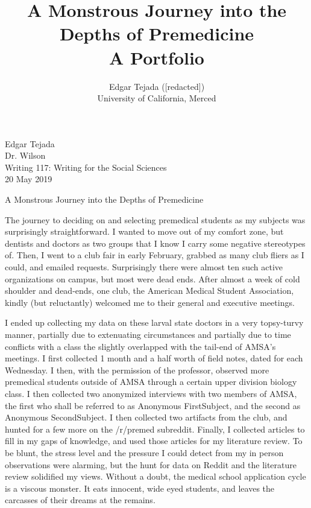 \documentclass [12pt]{article}
\title{A Monstrous Journey into the Depths of Premedicine\\\medskip A Portfolio}
\author{Edgar Tejada ([redacted])\\University of California, Merced}
\begin{document}
\begin{flushleft}
Edgar Tejada\\
Dr. Wilson\\
Writing 117: Writing for the Social Sciences\\
20 May 2019\\


\begin{center}
	A Monstrous Journey into the Depths of Premedicine\\
\end{center}


\setlength{\parindent}{0.5in}
The journey to deciding on and selecting premedical students as my subjects was surprisingly straightforward. I wanted to move out of my comfort zone, but dentists and doctors as two groups that I know I carry some negative stereotypes of. Then, I went to a club fair in early February, grabbed as many club fliers as I could, and emailed requests. Surprisingly there were almost ten such active organizations on campus, but most were dead ends.
After almost a week of cold shoulder and dead-ends, one club, the American Medical Student Association, kindly (but reluctantly) welcomed me to their general and executive meetings.

I ended up collecting my data on these larval state doctors in a very topsy-turvy manner, partially due to extenuating circumstances and partially due to time conflicts with a class the slightly overlapped with the tail-end of AMSA's meetings. I first collected 1 month and a half worth of field notes, dated for each Wednesday. I then, with the permission of the professor, observed more premedical students outside of AMSA through a certain upper division biology class. I then collected two anonymized interviews with two members of AMSA, the first who shall be referred to as Anonymous FirstSubject, and the second as Anonymous SecondSubject. I then collected two artifacts from the club, and hunted for a few more on the /r/premed subreddit. Finally, I collected articles to fill in my gaps of knowledge, and used those articles for my literature review. To be blunt, the stress level and the pressure I could detect from my in person observations were alarming, but the hunt for data on Reddit and the literature review solidified my views. Without a doubt, the medical school application cycle is a viscous monster. It eats innocent, wide eyed students, and leaves the carcasses of their dreams at the remains.



\newpage
\medskip %
\nocite{*} %
\printbibliography%

\end{flushleft}
\end{document}
